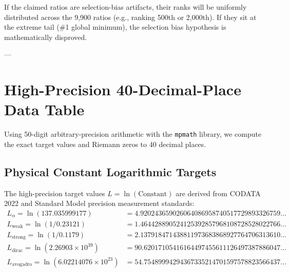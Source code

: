 \documentclass[11pt,a4paper]{article}
\begin{document}
If the claimed ratios are selection-bias artifacts, their ranks will be uniformly distributed across the 9,900 ratios (e.g., ranking 500th or 2,000th). If they sit at the extreme tail (\#1 global minimum), the selection bias hypothesis is mathematically disproved.

---

\section{High-Precision 40-Decimal-Place Data Table}

Using 50-digit arbitrary-precision arithmetic with the \texttt{mpmath} library, we compute the exact target values and Riemann zeros to 40 decimal places.

\subsection{Physical Constant Logarithmic Targets}
The high-precision target values $L = \ln(\text{Constant})$ are derived from CODATA 2022 and Standard Model precision measurement standards:
\begin{align}
L_\alpha = \ln(137.035999177) &= \mathbf{4.920243659026064086958740517729893326759...} \\
L_{\text{weak}} = \ln(1/0.23121) &= \mathbf{1.464428890524125392857968108728528022766...} \\
L_{\text{strong}} = \ln(1/0.1179) &= \mathbf{2.137918471438811973683868927764706313610...} \\
L_{\text{dirac}} = \ln(2.26903 \times 10^{39}) &= \mathbf{90.62017105416164497455611126497387886047...} \\
L_{\text{avogadro}} = \ln(6.02214076 \times 10^{23}) &= \mathbf{54.75489994294367335214701597578823566437...}
\end{align}
\end{document}
